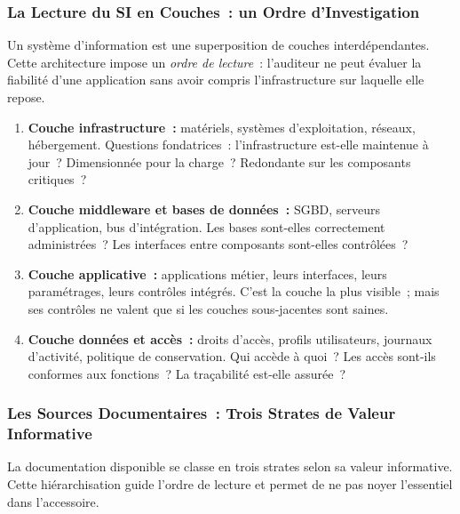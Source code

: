 \subsubsection{La Lecture du SI en Couches~: un Ordre d'Investigation}

Un système d'information est une superposition de couches interdépendantes. Cette
architecture impose un \emph{ordre de lecture}~: l'auditeur ne peut évaluer la
fiabilité d'une application sans avoir compris l'infrastructure sur laquelle elle
repose.

\begin{enumerate}
    \item \textbf{Couche infrastructure~:} matériels, systèmes d'exploitation, réseaux,
        hébergement. Questions fondatrices~: l'infrastructure est-elle maintenue à jour~?
        Dimensionnée pour la charge~? Redondante sur les composants critiques~?
    \item \textbf{Couche middleware et bases de données~:} SGBD, serveurs d'application,
        bus d'intégration. Les bases sont-elles correctement administrées~? Les interfaces
        entre composants sont-elles contrôlées~?
    \item \textbf{Couche applicative~:} applications métier, leurs interfaces, leurs
        paramétrages, leurs contrôles intégrés. C'est la couche la plus visible~; mais
        ses contrôles ne valent que si les couches sous-jacentes sont saines.
    \item \textbf{Couche données et accès~:} droits d'accès, profils utilisateurs,
        journaux d'activité, politique de conservation. Qui accède à quoi~? Les accès
        sont-ils conformes aux fonctions~? La traçabilité est-elle assurée~?
\end{enumerate}

\subsubsection{Les Sources Documentaires~: Trois Strates de Valeur Informative}

La documentation disponible se classe en trois strates selon sa valeur informative.
Cette hiérarchisation guide l'ordre de lecture et permet de ne pas noyer l'essentiel
dans l'accessoire.

